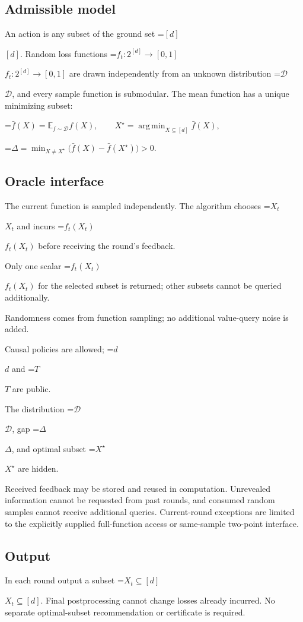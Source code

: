 \documentclass[10pt,a4paper]{article}
\newcommand{\AtlasMath}[1]{\par\begingroup\centering\setbox0=\hbox{$\displaystyle #1$}\ifdim\wd0>1.4\linewidth\typeout{ATLAS WIDE FORMULA: \the\wd0}\fi\ifdim\wd0>\linewidth\resizebox{\linewidth}{!}{\box0}\else\box0\fi\par\endgroup}
\newcommand{\AtlasInlineMath}[1]{\begingroup\setbox0=\hbox{$#1$}\ifdim\wd0>.4\linewidth\endgroup\AtlasMath{#1}\else\endgroup$#1$\fi}
\begin{document}
\subsection{Admissible model}
An action is any subset of the ground set \AtlasInlineMath{[d]}. Random loss functions \AtlasInlineMath{f_t:2^{[d]}\to[0,1]} are drawn independently from an unknown distribution \AtlasInlineMath{\mathcal{D}}, and every sample function is submodular. The mean function has a unique minimizing subset:


\AtlasMath{\bar f(X)=\mathbb{E}_{f\sim\mathcal{D}}f(X),\qquad X^\star=\operatorname*{arg\,min}_{X\subseteq[d]}\bar f(X),}



\AtlasMath{\Delta=\min_{X\ne X^\star}\bigl(\bar f(X)-\bar f(X^\star)\bigr)>0.}


\subsection{Oracle interface}
The current function is sampled independently. The algorithm chooses \AtlasInlineMath{X_t} and incurs \AtlasInlineMath{f_t(X_t)} before receiving the round's feedback.

Only one scalar \AtlasInlineMath{f_t(X_t)} for the selected subset is returned; other subsets cannot be queried additionally.

Randomness comes from function sampling; no additional value-query noise is added.

Causal policies are allowed; \AtlasInlineMath{d} and \AtlasInlineMath{T} are public.

The distribution \AtlasInlineMath{\mathcal{D}}, gap \AtlasInlineMath{\Delta}, and optimal subset \AtlasInlineMath{X^\star} are hidden.

Received feedback may be stored and reused in computation. Unrevealed information cannot be requested from past rounds, and consumed random samples cannot receive additional queries. Current-round exceptions are limited to the explicitly supplied full-function access or same-sample two-point interface.

\subsection{Output}
In each round output a subset \AtlasInlineMath{X_t\subseteq[d]}. Final postprocessing cannot change losses already incurred. No separate optimal-subset recommendation or certificate is required.
\end{document}
